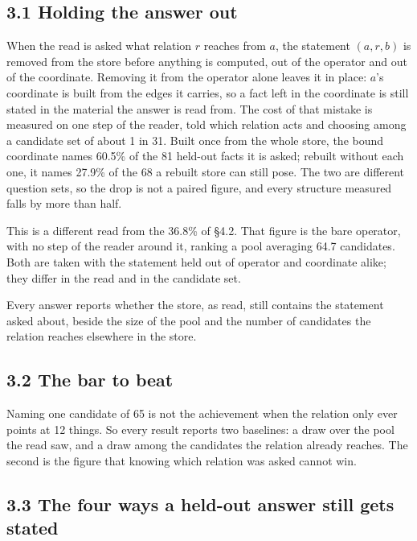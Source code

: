 \documentclass[10pt,letterpaper,twocolumn]{article}
\begin{document}
\subsection{3.1 Holding the answer out}\label{31-holding-the-answer-out}

When the read is asked what relation \(r\) reaches from \(a\), the statement \((a, r, b)\) is removed from
the store before anything is computed, out of the operator and out of the coordinate. Removing it
from the operator alone leaves it in place: \(a\)'s coordinate is built from the edges it carries, so a
fact left in the coordinate is still stated in the material the answer is read from. The cost of
that mistake is measured on one step of the reader, told which relation acts and choosing among a
candidate set of about 1 in 31. Built once from the whole store, the bound coordinate names 60.5\% of
the 81 held-out facts it is asked; rebuilt without each one, it names 27.9\% of the 68 a rebuilt store
can still pose. The two are different question sets, so the drop is not a paired figure, and every
structure measured falls by more than half.

This is a different read from the 36.8\% of §4.2. That figure is the bare operator, with no step of
the reader around it, ranking a pool averaging 64.7 candidates. Both are taken with the statement
held out of operator and coordinate alike; they differ in the read and in the candidate set.

Every answer reports whether the store, as read, still contains the statement asked about, beside the
size of the pool and the number of candidates the relation reaches elsewhere in the store.

\subsection{3.2 The bar to beat}\label{32-the-bar-to-beat}

Naming one candidate of 65 is not the achievement when the relation only ever points at 12 things.
So every result reports two baselines: a draw over the pool the read saw, and a draw among the
candidates the relation already reaches. The second is the figure that knowing which relation was
asked cannot win.

\subsection{3.3 The four ways a held-out answer still gets stated}\label{33-the-four-ways-a-held-out-answer-still-gets-stated}
\end{document}

